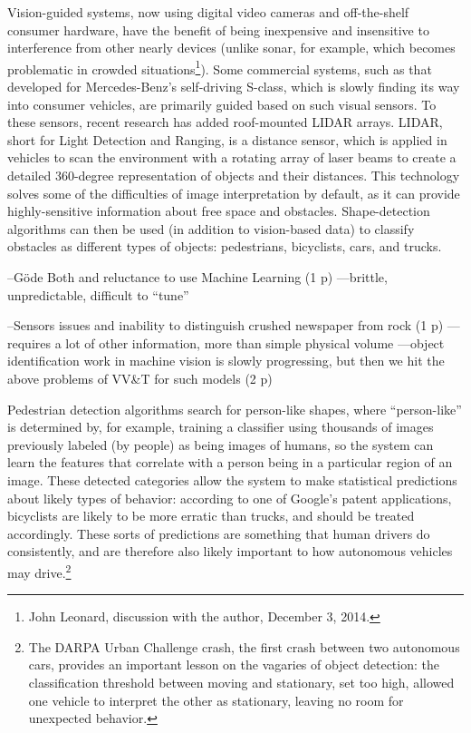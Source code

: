 Vision-guided systems, now using digital video cameras and
off-the-shelf consumer hardware, have the benefit of being inexpensive
and insensitive to interference from other nearly devices (unlike
sonar, for example, which becomes problematic in crowded
situations\footnote{John Leonard, discussion with the author, December
3, 2014.}). Some commercial systems, such as that developed for Mercedes-Benz's
self-driving S-class, which is slowly finding its way into consumer
vehicles, are primarily guided based on such visual sensors.\cite{???} To
these sensors, recent research has added roof-mounted LIDAR arrays.
LIDAR, short for Light Detection and Ranging, is a distance
sensor, which is applied in vehicles to scan the environment with a
rotating array of laser beams to create a detailed 360-degree
representation of objects and their distances. This technology
solves some of the difficulties of image interpretation by default, as
it can provide highly-sensitive information about free space and
obstacles. Shape-detection algorithms can then be used (in addition to
vision-based data) to classify obstacles as different types of
objects: pedestrians, bicyclists, cars, and trucks.\cite{???}

--Göde Both and reluctance to use Machine Learning (1 p)
---brittle, unpredictable, difficult to ``tune''

--Sensors issues and inability to distinguish crushed newspaper from
rock (1 p)
---requires a lot of other information, more than simple physical
volume
---object identification work in machine vision is slowly progressing,
but then we hit the above problems of VV\&T for such models (2 p)

Pedestrian detection algorithms search for person-like shapes, where
“person-like” is determined by, for example, training a classifier
using thousands of images previously labeled (by people) as being images of humans, so
the system can learn the features that correlate with a person being
in a particular region of an image. These detected categories allow the system to make
statistical predictions about likely types of behavior: according to
one of Google's patent applications, bicyclists are likely to be more
erratic than trucks, and should be treated
accordingly.\cite{predictPatent} These sorts of predictions are
something that human drivers do consistently, and are therefore also
likely important to how autonomous vehicles may drive.\footnote{The
  DARPA Urban Challenge crash, the first crash between two autonomous
  cars, provides an important lesson on the vagaries of object
  detection: the classification threshold between moving and
  stationary, set too high, allowed one vehicle to interpret the other
  as stationary, leaving no room for unexpected behavior.\cite{???}} 

